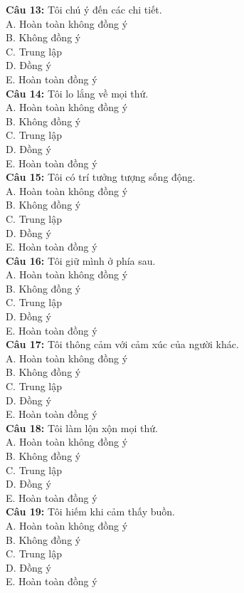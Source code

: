 \begin{multicols}{2}
\textbf{Câu 13:} Tôi chú ý đến các chi tiết. \\
A. Hoàn toàn không đồng ý \\
B. Không đồng ý \\
C. Trung lập \\
D. Đồng ý \\
E. Hoàn toàn đồng ý \\

\textbf{Câu 14:} Tôi lo lắng về mọi thứ. \\
A. Hoàn toàn không đồng ý \\
B. Không đồng ý \\
C. Trung lập \\
D. Đồng ý \\
E. Hoàn toàn đồng ý \\

\textbf{Câu 15:} Tôi có trí tưởng tượng sống động. \\
A. Hoàn toàn không đồng ý \\
B. Không đồng ý \\
C. Trung lập \\
D. Đồng ý \\
E. Hoàn toàn đồng ý \\

\textbf{Câu 16:} Tôi giữ mình ở phía sau. \\
A. Hoàn toàn không đồng ý \\
B. Không đồng ý \\
C. Trung lập \\
D. Đồng ý \\
E. Hoàn toàn đồng ý \\

\textbf{Câu 17:} Tôi thông cảm với cảm xúc của người khác. \\
A. Hoàn toàn không đồng ý \\
B. Không đồng ý \\
C. Trung lập \\
D. Đồng ý \\
E. Hoàn toàn đồng ý \\

\textbf{Câu 18:} Tôi làm lộn xộn mọi thứ. \\
A. Hoàn toàn không đồng ý \\
B. Không đồng ý \\
C. Trung lập \\
D. Đồng ý \\
E. Hoàn toàn đồng ý \\

\textbf{Câu 19:} Tôi hiếm khi cảm thấy buồn. \\
A. Hoàn toàn không đồng ý \\
B. Không đồng ý \\
C. Trung lập \\
D. Đồng ý \\
E. Hoàn toàn đồng ý \\


\end{multicols}

